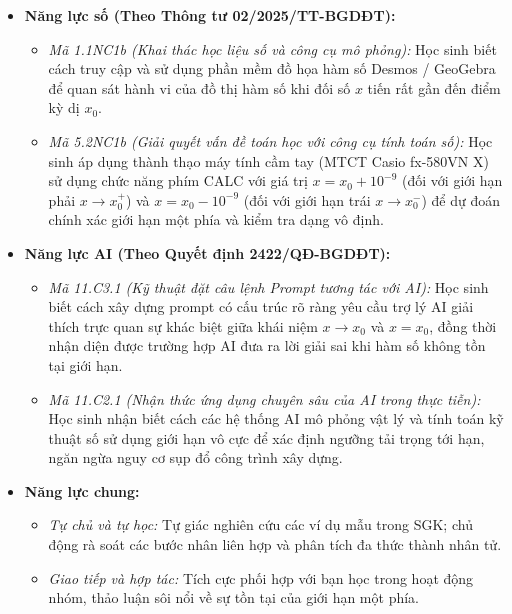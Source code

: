\documentclass[12pt, a4paper]{article}
\begin{document}
\begin{itemize}[leftmargin=1.2cm]
    \item \textbf{Năng lực số (Theo Thông tư 02/2025/TT-BGDĐT):}
    \begin{itemize}[leftmargin=0.6cm]
        \item \textit{Mã 1.1NC1b (Khai thác học liệu số và công cụ mô phỏng):} Học sinh biết cách truy cập và sử dụng phần mềm đồ họa hàm số Desmos / GeoGebra để quan sát hành vi của đồ thị hàm số khi đối số $x$ tiến rất gần đến điểm kỳ dị $x_0$.
        \item \textit{Mã 5.2NC1b (Giải quyết vấn đề toán học với công cụ tính toán số):} Học sinh áp dụng thành thạo máy tính cầm tay (MTCT Casio fx-580VN X) sử dụng chức năng phím CALC với giá trị $x = x_0 + 10^{-9}$ (đối với giới hạn phải $x \to x_0^+$) và $x = x_0 - 10^{-9}$ (đối với giới hạn trái $x \to x_0^-$) để dự đoán chính xác giới hạn một phía và kiểm tra dạng vô định.
    \end{itemize}

    \item \textbf{Năng lực AI (Theo Quyết định 2422/QĐ-BGDĐT):}
    \begin{itemize}[leftmargin=0.6cm]
        \item \textit{Mã 11.C3.1 (Kỹ thuật đặt câu lệnh Prompt tương tác với AI):} Học sinh biết cách xây dựng prompt có cấu trúc rõ ràng yêu cầu trợ lý AI giải thích trực quan sự khác biệt giữa khái niệm $x \to x_0$ và $x = x_0$, đồng thời nhận diện được trường hợp AI đưa ra lời giải sai khi hàm số không tồn tại giới hạn.
        \item \textit{Mã 11.C2.1 (Nhận thức ứng dụng chuyên sâu của AI trong thực tiễn):} Học sinh nhận biết cách các hệ thống AI mô phỏng vật lý và tính toán kỹ thuật số sử dụng giới hạn vô cực để xác định ngưỡng tải trọng tới hạn, ngăn ngừa nguy cơ sụp đổ công trình xây dựng.
    \end{itemize}

    \item \textbf{Năng lực chung:}
    \begin{itemize}[leftmargin=0.6cm]
        \item \textit{Tự chủ và tự học:} Tự giác nghiên cứu các ví dụ mẫu trong SGK; chủ động rà soát các bước nhân liên hợp và phân tích đa thức thành nhân tử.
        \item \textit{Giao tiếp và hợp tác:} Tích cực phối hợp với bạn học trong hoạt động nhóm, thảo luận sôi nổi về sự tồn tại của giới hạn một phía.
    \end{itemize}
\end{itemize}
\end{document}
